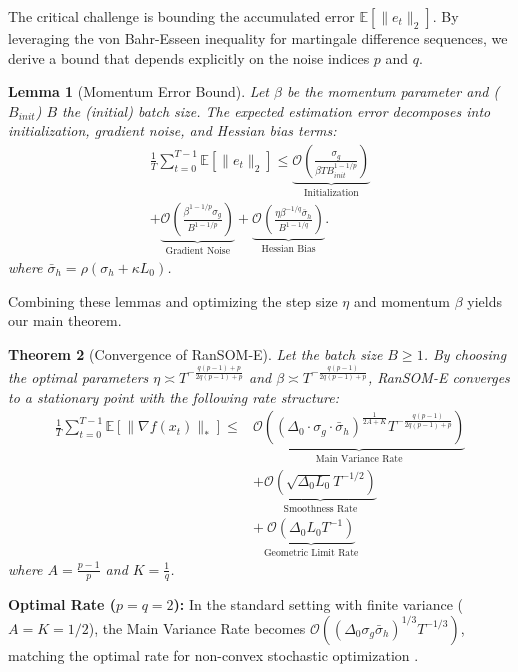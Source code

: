 \documentclass{article}
\theoremstyle{plain}
\newtheorem{theorem}{Theorem}[section]
\newtheorem{lemma}[theorem]{Lemma}
\theoremstyle{definition}
\theoremstyle{remark}
\begin{document}
The critical challenge is bounding the accumulated error $\mathbb{E}[\|e_t\|_2]$. By leveraging the von Bahr-Esseen inequality for martingale difference sequences, we derive a bound that depends explicitly on the noise indices $p$ and $q$.

\begin{lemma}[Momentum Error Bound]
\label{lemma:main_error}
Let $\beta$ be the momentum parameter and ($B_{init}$) $B$  the (initial) batch size. The expected estimation error decomposes into initialization, gradient noise, and Hessian bias terms:
\begin{multline*}
    \frac{1}{T} \sum_{t=0}^{T-1}\mathbb{E}[\|e_t\|_2] \le \underbrace{\mathcal{O}\left( \frac{\sigma_g}{\beta T B_{init}^{1-1/p}} \right)}_{\text{Initialization}} \\+ \underbrace{\mathcal{O}\left( \frac{\beta^{1-1/p} \sigma_g}{B^{1-1/p}} \right)}_{\text{Gradient Noise}} + \underbrace{\mathcal{O}\left( \frac{\eta \beta^{-1/q} \bar{\sigma}_h}{B^{1-1/q}} \right)}_{\text{Hessian Bias}}.
\end{multline*}
where $\bar{\sigma}_h = \rho (\sigma_h + \kappa L_0)$.
\end{lemma}

Combining these lemmas and optimizing the step size $\eta$ and momentum $\beta$ yields our main theorem.

\begin{theorem}[Convergence of RanSOM-E]
\label{thm:expsom_convergence}
Let the batch size $B \ge 1$. By choosing the optimal parameters $\eta \asymp T^{-\frac{q(p-1)+p}{2q(p-1)+p}}$ and $\beta \asymp T^{-\frac{q(p-1)}{2q(p-1)+p}}$, RanSOM-E converges to a stationary point with the following rate structure:
\begin{align}
    \frac{1}{T} \sum_{t=0}^{T-1} \mathbb{E}[\|\nabla f(x_t)\|_*] \le & \underbrace{\mathcal{O}\left( (\Delta_0 \cdot \sigma_g \cdot \bar{\sigma}_h)^{\frac{1}{2A+K}} T^{-\frac{q(p-1)}{2q(p-1)+p}} \right)}_{\text{Main Variance Rate}} \nonumber \\
    & + \underbrace{\mathcal{O}\left( \sqrt{\Delta_0 L_0} T^{-1/2} \right)}_{\text{Smoothness Rate}} \nonumber \\
    & + \underbrace{\mathcal{O}\left( \Delta_0 L_0 T^{-1} \right)}_{\text{Geometric Limit Rate}}
\end{align}
where $A = \frac{p-1}{p}$ and $K = \frac{1}{q}$.


\end{theorem}

\textbf{Optimal Rate ($p=q=2$):} In the standard setting with finite variance ($A=K=1/2$), the Main Variance Rate becomes $\mathcal{O}\left( (\Delta_0 \sigma_g \bar{\sigma}_h)^{1/3} T^{-1/3} \right)$, matching the optimal rate for non-convex stochastic optimization \cite{cutkosky2019storm, arjevani2023lower}.
\end{document}
